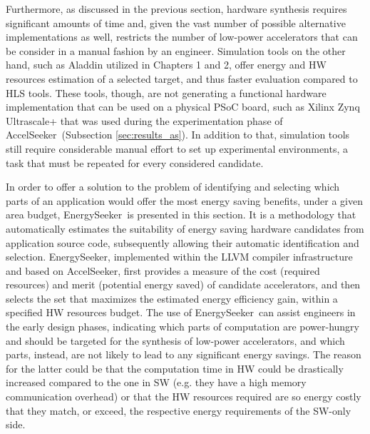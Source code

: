 \documentclass[]{usiinfthesis}
\newcommand{\aseeker}{{AccelSeeker}}
\newcommand{\eseeker}{{EnergySeeker}}
\begin{document}
Furthermore, as discussed in the previous section, hardware
synthesis requires significant amounts of time and, given 
the vast number of possible alternative implementations as well, restricts
the number of low-power accelerators that can be consider in a 
manual fashion by an engineer.
Simulation tools on the other hand, such as Aladdin \cite{ShaoJul14} utilized in Chapters 1 and 2, 
offer energy and HW resources estimation of a selected target, and thus faster evaluation compared to HLS 
tools. These tools,
though, are not generating a functional hardware implementation that can be used on a 
physical PSoC board, such as Xilinx Zynq Ultrascale+ that was used during the experimentation
phase of \aseeker\ (Subsection \ref{sec:results_as}).
In addition to that, simulation tools still require considerable
manual effort to set up experimental environments, a task that must be
repeated for every considered candidate.\par

In order to offer a solution to the problem of identifying and selecting
which parts of an application would offer the most energy saving benefits,
under a given area budget,
\eseeker\ is presented in this section. 
It is a methodology that automatically
estimates the suitability of energy saving hardware candidates from application
source code, subsequently allowing their automatic identification and
selection. \eseeker, implemented within the LLVM
\cite{LattnerMar04} compiler infrastructure and based on \aseeker, first provides a measure
of the cost (required resources) and merit (potential energy saved)
of candidate accelerators, and then selects the set that maximizes 
the estimated energy efficiency gain, within a specified HW resources 
budget. The use of \eseeker\ can assist engineers in the early design phases,
indicating which parts of computation are power-hungry and
should be targeted for the synthesis of low-power accelerators, and which parts,
instead, are not likely to lead to any significant energy savings. The reason for
the latter could be that the computation time in HW could be drastically increased
compared to the one in SW (e.g. they have a high memory communication overhead) or
that the HW resources required are so energy costly that they match, or exceed, the 
respective energy requirements of the SW-only side.
\end{document}
